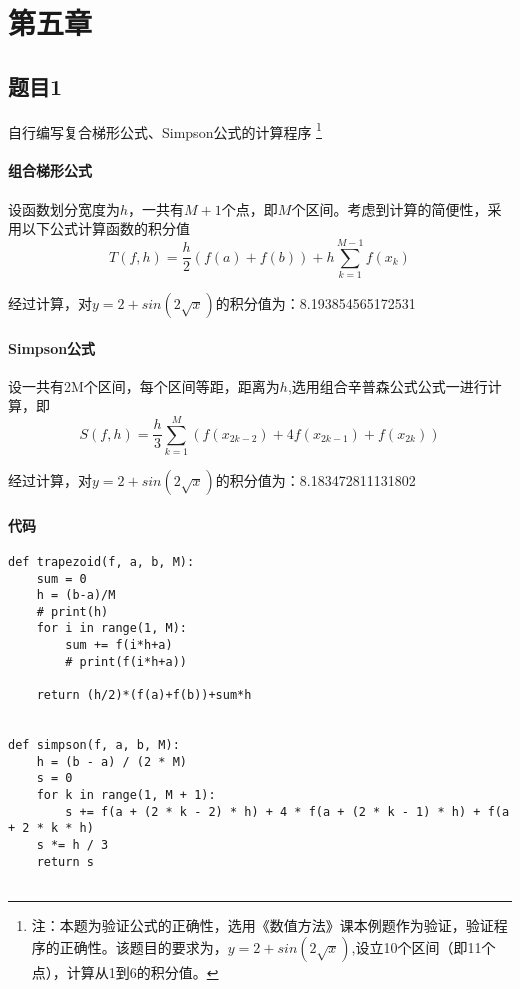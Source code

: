 \section{第五章}



\subsection{题目1}

自行编写复合梯形公式、Simpson公式的计算程序 \footnote{注：本题为验证公式的正确性，选用《数值方法》课本例题作为验证，验证程序的正确性。该题目的要求为，$y=2+sin(2\sqrt{x})$,设立10个区间（即11个点），计算从1到6的积分值。}


\paragraph{组合梯形公式}

设函数划分宽度为$h$，一共有$M+1$个点，即$M$个区间。考虑到计算的简便性，采用以下公式计算函数的积分值
$$T(f,h)=\frac{h}{2}(f(a)+f(b))+h\sum_{k=1}^{M-1} f(x_k)$$

经过计算，对$y=2+sin(2\sqrt{x})$的积分值为：8.193854565172531

\paragraph{Simpson公式}

设一共有2M个区间，每个区间等距，距离为$h$,选用组合辛普森公式公式一进行计算，即
$$S(f,h)=\frac{h}{3}\sum_{k=1}^{M}(f(x_{2k-2})+4f(x_{2k-1})+f(x_{2k}))$$

经过计算，对$y=2+sin(2\sqrt{x})$的积分值为：8.183472811131802

\paragraph{代码}
\begin{verbatim}
def trapezoid(f, a, b, M):
    sum = 0
    h = (b-a)/M
    # print(h)
    for i in range(1, M):
        sum += f(i*h+a)
        # print(f(i*h+a))

    return (h/2)*(f(a)+f(b))+sum*h
    
    
def simpson(f, a, b, M):
    h = (b - a) / (2 * M)
    s = 0
    for k in range(1, M + 1):
        s += f(a + (2 * k - 2) * h) + 4 * f(a + (2 * k - 1) * h) + f(a + 2 * k * h)
    s *= h / 3
    return s


\end{verbatim}

